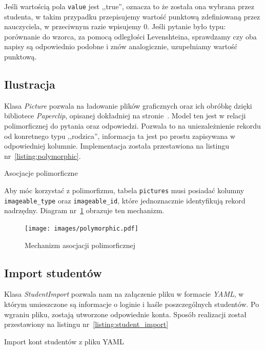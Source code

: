 \documentclass[12pt,twoside]{report}
\begin{document}
Jeśli wartością pola \texttt{value} jest ,,true'', oznacza to że została ona wybrana przez studenta, w
takim przypadku przepisujemy wartość punktową zdefiniowaną przez nauczyciela, w przeciwnym
razie wpisujemy 0. Jeśli pytanie było typu: porównanie do wzorca, za pomocą odległości
Levenshteina, sprawdzamy czy oba napisy są odpowiednio podobne i znów analogicznie,
uzupełniamy wartość punktową.

\subsection{Ilustracja}
Klasa \emph{Picture} pozwala na ładowanie plików graficznych oraz ich obróbkę dzięki
bibliotece \emph{Paperclip}, opisanej dokładniej na stronie~\pageref{sec:paperclip}.
Model ten jest w relacji polimorficznej do pytania oraz odpowiedzi. Pozwala to na
uniezależnienie rekordu od konretnego typu ,,rodzica'', informacja ta jest po prostu
zapisywana w odpowiedniej kolumnie. Implementacja została przestawiona na listingu
nr~\ref{listing:polymorphic}.

\begin{listing}
  
  \caption{Asocjacje polimorficzne}
  \label{listing:polymorphic}
\end{listing}


Aby móc korzystać z polimorfizmu, tabela \texttt{pictures} musi posiadać kolumny
\texttt{imageable\_type} oraz \texttt{imageable\_id}, które jednoznacznie identyfikują
rekord nadrzędny. Diagram nr~\ref{fig:polymorphic} obrazuje ten mechanizm.

\begin{figure}[ht]
  \begin{center}
    \texttt{[image: images/polymorphic.pdf]}
  \end{center}
  \caption{Mechanizm asocjacji polimorficznej}
  \label{fig:polymorphic}
\end{figure}

\subsection{Import studentów}
Klasa \emph{StudentImport} pozwala nam na załączenie pliku w formacie \emph{YAML}, w
którym umieszczone są informacje o loginie i haśle poszczególnych studentów. Po wgraniu
pliku, zostają utworzone odpowiednie konta. Sposób realizacji został przestawiony na
listingu nr~\ref{listing:student_import}

\begin{listing}
  
  \caption{Import kont studentów z pliku YAML}
  \label{listing:student_import}
\end{listing}
\end{document}
